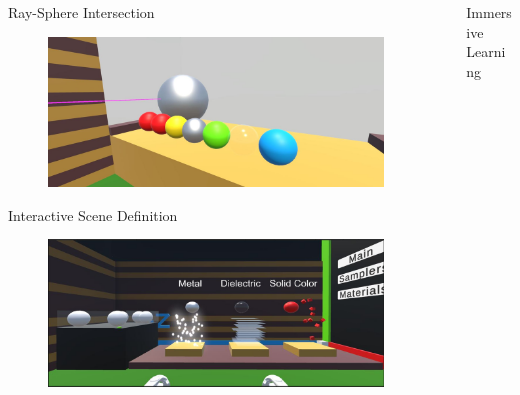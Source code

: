 \documentclass[final,hyperref={pdfpagelabels=false}]{beamer}
\begin{document}
\begin{frame}[t]
\begin{columns}[t]
\begin{column}{.465\textwidth}
\begin{block}{Ray-Sphere Intersection}
    \begin{figure}
    	\centering
        \includegraphics[width=0.95\linewidth]{duringProcessHitObjects}
    \end{figure}
\end{block}

\begin{block}{Interactive Scene Definition}
    \begin{figure}
    	\centering
        \includegraphics[width=0.95\linewidth]{sphereCreating}
    \end{figure}
\end{block}

\end{column}

\begin{column}{.025\textwidth}\end{column} %

\begin{column}{0.465\textwidth} %
\begin{block}{Immersive Learning}
    \vspace{2.2cm}


\end{block}
\end{column}
\end{columns}
\end{frame}
\end{document}
